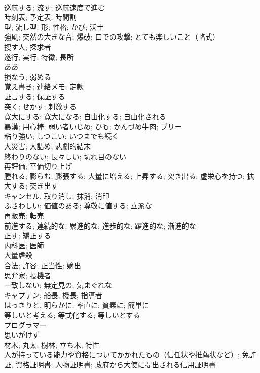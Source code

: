 \documentclass[8pt]{extreport}
\begin{document}
\begin{CJK}{UTF8}{min}
\\	巡航する; 流す; 巡航速度で進む	
\\	時刻表; 予定表; 時間割	
\\	型; 流し型; 形; 性格; かび; 沃土	
\\	強風; 突然の大きな音; 爆破; 口での攻撃; とても楽しいこと（略式）	
\\	捜す人; 探求者	
\\	遂行; 実行; 特徴; 長所	
\\	ああ	
\\	損なう; 弱める	
\\	覚え書き; 連絡メモ; 定款	
\\	証言する; 保証する	
\\	突く; せかす; 刺激する	
\\	寛大にする; 寛大になる; 自由化する; 自由化される	
\\	暴漢; 用心棒; 弱い者いじめ; ひも; かんづめ牛肉; ブリー	
\\	粘り強い; しつこい; いつまでも続く	
\\	大災害; 大詰め; 悲劇的結末	
\\	終わりのない; 長々しい; 切れ目のない	
\\	再評価; 平価切り上げ	
\\	腫れる; 膨らむ, 膨張する; 大量に増える; 上昇する; 突き出る; 虚栄心を持つ; 拡大する; 突き出す	
\\	キャンセル, 取り消し; 抹消; 消印	
\\	ふさわしい; 価値のある; 尊敬に値する; 立派な	
\\	再販売; 転売	
\\	前進する; 連続的な; 累進的な; 進歩的な; 躍進的な; 漸進的な	
\\	正す; 矯正する	
\\	内科医; 医師	
\\	大量虐殺	
\\	合法; 許容; 正当性; 嫡出	
\\	思弁家; 投機者	
\\	一致しない; 無定見の; 気まぐれな	
\\	キャプテン; 船長; 機長; 指導者	
\\	はっきりと, 明らかに; 率直に; 質素に; 簡単に	
\\	等しいと考える; 等式化する; 等しいとする	
\\	プログラマー	
\\	思いがけず	
\\	材木; 丸太; 樹林; 立ち木; 特性	
\\	人が持っている能力や資格についてかかれたもの（信任状や推薦状など）; 免許証, 資格証明書; 人物証明書; 政府から大使に提出される信用証明書	

\end{CJK}
\end{document}
